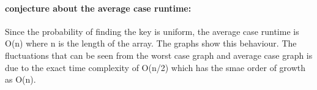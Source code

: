\documentclass{article}
\begin{document}
\paragraph*{conjecture about the average case runtime: }
Since the probability of finding the key is uniform, the average case runtime is O(n) where n is the length of the array. The graphs show this behaviour. The fluctuations that can be seen from the worst case graph and average case graph is due to the exact time complexity of O(n/2) which has the smae order of growth as O(n).
\end{document}
